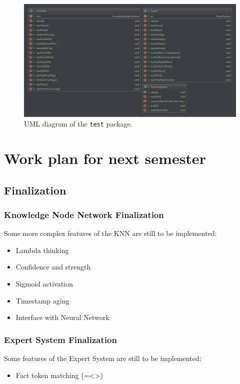 \documentclass{beamer}
\newcommand{\code}[1]{\texttt{#1}}
\begin{document}
	\begin{frame}
		\begin{figure}
			\centering
			\includegraphics[width=\textwidth]{figures/uml_test.pdf}
			\caption
			{UML diagram of the \code{test} package.}
			\label{fig:uml_test}
		\end{figure}
	\end{frame}
	
	\section[Next semester]{Work plan for next semester}
	
	\subsection{Finalization}
	
	\begin{frame}
		\frametitle{Knowledge Node Network Finalization}
		Some more complex features of the KNN are still to be implemented:
		\begin{itemize}
			\item Lambda thinking
			\item Confidence and strength
			\item Sigmoid activation
			\item Timestamp aging
			\item Interface with Neural Network
		\end{itemize}
	\end{frame}
	
	\begin{frame}
		\frametitle{Expert System Finalization}
		Some features of the Expert System are still to be implemented:
		\begin{itemize}
			\item Fact token matching (=\quad \textless \quad \textgreater)
		\end{itemize}
	\end{frame}
\end{document}

